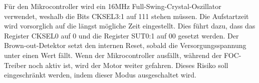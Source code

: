 %
Für den Mikrocontroller wird ein 16MHz Full-Swing-Crystal-Oszillator verwendet, weshalb die Bits CKSEL3:1 auf 111 stehen müssen.
Die Aufstartzeit wird vorsorglich auf die längst mögliche Zeit eingestellt. Dies führt dazu, dass das Register CKSEL0 auf 0 und die Register SUT0:1 auf 00 gesetzt werden.
%
%
%
%
%
%
%
%
%
%
%
%
Der Brown-out-Detektor setzt den internen Reset, sobald die Versorgungsspannung unter einen Wert fällt. Wenn der Mikrocontroller ausfällt, während der FOC-Treiber noch aktiv ist, wird der Motor weiter gefahren. Dieses Risiko soll eingeschränkt werden, indem dieser Modus ausgeschaltet wird.\cite{haftmann_programmierung_nodate}

